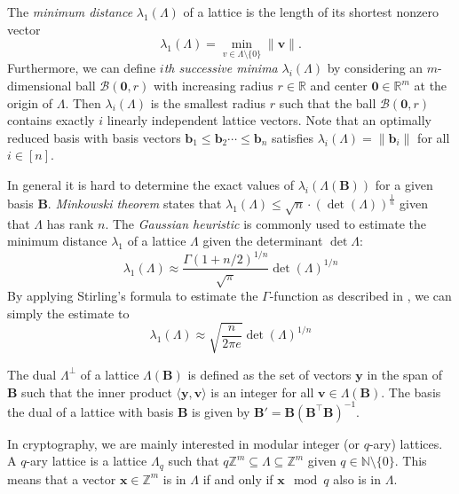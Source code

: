 The \textit{minimum distance} $\lambda_1(\Lambda)$ of a lattice is the length of its shortest nonzero vector
\begin{equation}
    \lambda_1(\Lambda) = \min_{v \in \Lambda \setminus \{0\}}\|\mathbf{v}\|.
\end{equation}
Furthermore, we can define \textit{$i$th successive minima} $\lambda_i(\Lambda)$ by considering an $m$-dimensional ball $\mathcal{B}(\mathbf{0}, r)$ with increasing radius $r \in \mathbb{R}$ and center $\mathbf{0} \in \mathbb{R}^m$ at the origin of $\Lambda$. Then  $\lambda_i(\Lambda)$ is the smallest radius $r$ such that the ball $\mathcal{B}(\mathbf{0}, r)$ contains exactly $i$ linearly independent lattice vectors. Note that an optimally reduced basis with basis vectors $\mathbf{b}_1 \leq \mathbf{b}_2 \cdots \leq \mathbf{b}_n$ satisfies $\lambda_i(\Lambda) = \|\mathbf{b}_i\|$ for all $i\in [n]$.


In general it is hard to determine the exact values of $\lambda_i(\Lambda(\mathbf{B}))$ for a given basis $\mathbf{B}$. \textit{Minkowski theorem} states that $\lambda_1(\Lambda) \leq \sqrt{n} \cdot (\det(\Lambda))^{\frac{1}{n}}$ given that $\Lambda$ has rank $n$.
The \textit{Gaussian heuristic} is commonly used to estimate the minimum distance $\lambda_1$ of a lattice $\Lambda$ given the determinant $\det{\Lambda}$:
\begin{equation}\label{eq:gaussian-heuristic}
    \lambda_1(\Lambda) \approx \frac{\Gamma(1 + n/2)^{1/n}}{\sqrt{\pi}} \det(\Lambda)^{1/n}
\end{equation}
By applying Stirling's formula to estimate the $\Gamma$-function as described in \cite{Gop16}, we can simply the estimate to
\begin{equation}\label{eq:simplified-gaussian-heuristic}
    \lambda_1(\Lambda) \approx \sqrt{\frac{n}{2\pi e}} \det(\Lambda)^{1/n}
\end{equation}

The dual $\Lambda^{\perp}$ of a lattice $\Lambda(\mathbf{B})$ is defined as the set of vectors $\mathbf{y}$ in the span of $\mathbf{B}$ such that the inner product $\langle \mathbf{y}, \mathbf{v} \rangle$  is an integer for all $\mathbf{v} \in \Lambda(\mathbf{B})$. The basis the dual of a lattice with basis $\mathbf{B}$ is given by $\mathbf{B'} = \mathbf{B} (\mathbf{B}^\intercal \mathbf{B})^{-1}$.

In cryptography, we are mainly interested in modular integer (or $q$-ary) lattices. A $q$-ary lattice is a lattice $\Lambda_q$ such that $q\mathbb{Z}^m \subseteq	\Lambda \subseteq	\mathbb{Z}^m$ given $q \in \mathbb{N}\setminus \{0\}$. This means that a vector $\mathbf{x} \in \mathbb{Z}^m$ is in $\Lambda$ if and only if $\mathbf{x} \mod q$ also is in $\Lambda$.

